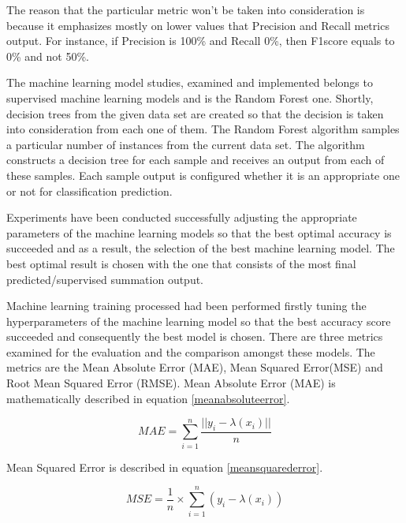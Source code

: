 \documentclass[review]{elsarticle}
\begin{document}
The reason that the particular metric won't be taken into consideration is because it emphasizes mostly on lower values that Precision and Recall metrics output. For instance, if Precision is 100\% and Recall 0\%, then F1\-score equals to 0\% and not 50\%. 

The machine learning model studies, examined and implemented belongs to supervised machine learning models and is the Random Forest one. Shortly, decision trees from the given data set are created so that the decision is taken into consideration from each one of them. The Random Forest algorithm samples a particular number of instances from the current data set. The algorithm constructs a decision tree for each sample and receives an output from each of these samples. Each sample output is configured whether it is an appropriate one or not for classification prediction. 

Experiments have been conducted successfully adjusting the appropriate parameters of the machine learning models so that the best optimal accuracy is succeeded and as a result, the selection of the best machine learning model. The best optimal result is chosen with the one that consists of the most final predicted/supervised summation output.

Machine learning training processed had been performed firstly tuning the hyperparameters of the machine learning model so that the best accuracy score succeeded and consequently the best model is chosen. There are three metrics examined for the evaluation and the comparison amongst these models. The metrics are the Mean Absolute Error (MAE), Mean Squared Error(MSE) and Root Mean Squared Error (RMSE). Mean Absolute Error (MAE) is mathematically described in equation \ref{meanabsoluteerror}.

\begin{equation}\label{meanabsoluteerror}
		MAE = \sum_{i=1}^{n} \frac{||y_{i} - \lambda(x_{i})||}{n}
\end{equation}


Mean Squared Error is described in equation \ref{meansquarederror}.

\begin{equation}\label{meansquarederror}
		MSE = \frac{1}{n} \times \sum_{i=1}^{n} (y_{i} - \lambda(x_{i}))
\end{equation}
\end{document}
